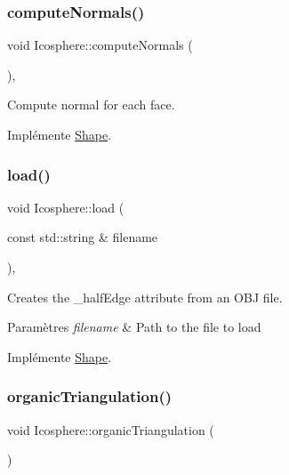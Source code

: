 \subsubsection{\texorpdfstring{compute\+Normals()}{computeNormals()}}
{\footnotesize\ttfamily void Icosphere\+::compute\+Normals (\begin{DoxyParamCaption}{ }\end{DoxyParamCaption})\hspace{0.3cm}{\ttfamily [override]}, {\ttfamily [virtual]}}



Compute normal for each face. 



Implémente \hyperlink{class_shape_afd886ad433d08a566003073bfd837f40}{Shape}.

\mbox{\label{class_icosphere_a72c3cc3d95cf508a623fe336cbbab350}} 
\subsubsection{\texorpdfstring{load()}{load()}}
{\footnotesize\ttfamily void Icosphere\+::load (\begin{DoxyParamCaption}\item[{const std\+::string \&}]{filename }\end{DoxyParamCaption})\hspace{0.3cm}{\ttfamily [override]}, {\ttfamily [virtual]}}



Creates the \+\_\+half\+Edge attribute from an O\+BJ file. 


\begin{DoxyParams}{Paramètres}
{\em filename} & Path to the file to load \\
\hline
\end{DoxyParams}


Implémente \hyperlink{class_shape_a20d654ec232b682c36cd8b28d2cba750}{Shape}.

\mbox{\label{class_icosphere_ab3470de718fee359ef4691e0c2ee987a}} 
\subsubsection{\texorpdfstring{organic\+Triangulation()}{organicTriangulation()}}
{\footnotesize\ttfamily void Icosphere\+::organic\+Triangulation (\begin{DoxyParamCaption}{ }\end{DoxyParamCaption})\hspace{0.3cm}{\ttfamily [private]}}



